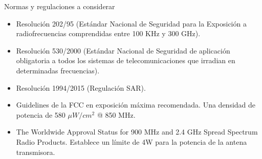 Normas y regulaciones a considerar

\begin{itemize}
\item Resolución 202/95  (Estándar Nacional de Seguridad para la Exposición a radiofrecuencias comprendidas entre 100 KHz y 300 GHz).
\item Resolución 530/2000 (Estándar Nacional de Seguridad de aplicación obligatoria a todos los sistemas de telecomunicaciones que irradian en determinadas frecuencias).
\item Resolución 1994/2015 (Regulación SAR).
\item Guidelines de la FCC en exposición máxima recomendada. Una densidad de potencia de 580 $\mu W/{cm}^2$ @ 850 MHz.
\item The Worldwide Approval Status for 900 MHz and 2.4 GHz Spread Spectrum Radio Products.
\quad Establece un límite de 4W para la potencia de la antena transmisora.

\end{itemize}









